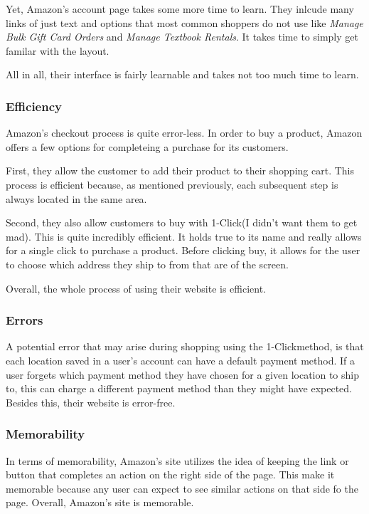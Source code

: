 \documentclass[11pt, oneside]{article}
\begin{document}
Yet, Amazon's account page takes some more time to learn. They inlcude many links of just text and options that most common shoppers do not use like \textit{Manage Bulk Gift Card Orders} and \textit{Manage Textbook Rentals}. It takes time to simply get familar with the layout.

All in all, their interface is fairly learnable and takes not too much time to learn.

\subsubsection{Efficiency}
Amazon's checkout process is quite error-less. In order to buy a product, Amazon offers a few options for completeing a purchase for its customers. 

First, they allow the customer to add their product to their shopping cart. This process is efficient because, as mentioned previously, each subsequent step is always located in the same area.

Second, they also allow customers to buy with 1-Click\textregistered\hspace{2 mm}(I didn't want them to get mad). This is quite incredibly efficient. It holds true to its name and really allows for a single click to purchase a product. Before clicking buy, it allows for the user to choose which address they ship to from that are of the screen.

Overall, the whole process of using their website is efficient.

\subsubsection{Errors}
A potential error that may arise during shopping using the 1-Click\textregistered\hspace{2 mm}method, is that each location saved in a user's account can have a default payment method. If a user forgets which payment method they have chosen for a given location to ship to, this can charge a different payment method than they might have expected. Besides this, their website is error-free.

\subsubsection{Memorability}
In terms of memorability, Amazon's site utilizes the idea of keeping the link or button that completes an action on the right side of the page. This make it memorable because any user can expect to see similar actions on that side fo the page. Overall, Amazon's site is memorable.
\end{document}
